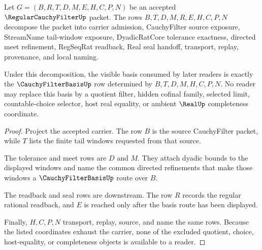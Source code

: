 \begin{theorem}
\label{thm:regularcauchyfilter-carrier-basis}
Let $G=(B,R,T,D,M,E,H,C,P,N)$ be an accepted $\RegularCauchyFilterUp$ packet. The rows $B,T,D,M,R,E,H,C,P,N$ decompose the packet into carrier admission, CauchyFilter source exposure, StreamName tail-window exposure, DyadicRatCore tolerance exactness, directed meet refinement, RegSeqRat readback, Real seal handoff, transport, replay, provenance, and local naming.

Under this decomposition, the visible basis consumed by later readers is exactly the $\CauchyFilterBasisUp$ row determined by $B,T,D,M,H,C,P,N$. No reader may replace this basis by a quotient filter, hidden cofinal family, selected limit, countable-choice selector, host real equality, or ambient $\RealUp$ completeness coordinate.
\end{theorem}
\begin{proof}
Project the accepted carrier. The row $B$ is the source CauchyFilter packet, while $T$ lists the finite tail windows requested from that source.

The tolerance and meet rows are $D$ and $M$. They attach dyadic bounds to the displayed windows and name the common directed refinements that make those windows a $\CauchyFilterBasisUp$ route over $B$.

The readback and seal rows are downstream. The row $R$ records the regular rational readback, and $E$ is reached only after the basis route has been displayed.

Finally, $H,C,P,N$ transport, replay, source, and name the same rows. Because the listed coordinates exhaust the carrier, none of the excluded quotient, choice, host-equality, or completeness objects is available to a reader.
\end{proof}

